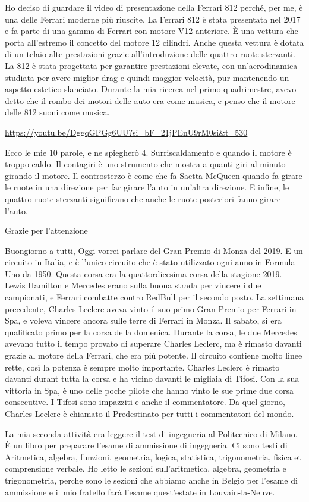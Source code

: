 \documentclass[12pt]{article}
\begin{document}
Ho deciso di guardare il video di presentazione della Ferrari 812 perché, per me, è una delle Ferrari moderne più riuscite. La Ferrari 812 è stata presentata nel 2017 e fa parte di una gamma di Ferrari con motore V12 anteriore. È una vettura che porta all'estremo il concetto del motore 12 cilindri. Anche questa vettura è dotata di un telaio alte prestazioni grazie all'introduzione delle quattro ruote sterzanti. La 812 è stata progettata per garantire prestazioni elevate, con un'aerodinamica studiata per avere miglior drag e quindi maggior velocità, pur mantenendo un aspetto estetico slanciato. Durante la mia ricerca nel primo quadrimestre, avevo detto che il rombo dei motori delle auto era come musica, e penso che il motore delle 812 suoni come musica. %

\url{https://youtu.be/DggqGPGg6UU?si=bF_21jPEnU9rM0si&t=530}

Ecco le mie 10 parole, e ne spiegherò 4. Surriscaldamento e quando il motore è troppo caldo. Il contagiri è uno strumento che mostra a quanti giri al minuto girando il motore. Il controsterzo è come che fa Saetta McQueen quando fa girare le ruote in una direzione per far girare l'auto in un'altra direzione. E infine, le quattro ruote sterzanti significano che anche le ruote posteriori fanno girare l'auto.

Grazie per l'attenzione

\newpage
Buongiorno a tutti, 
Oggi vorrei parlare del Gran Premio di Monza del 2019. E un circuito in Italia, e è l'unico circuito che è stato utilizzato ogni anno in Formula Uno da 1950. 
Questa corsa era la quattordicesima corsa della stagione 2019. Lewis Hamilton e Mercedes erano sulla buona strada per vincere i due campionati, e Ferrari combatte contro RedBull per il secondo posto. La settimana precedente, Charles Leclerc aveva vinto il suo primo Gran Premio per Ferrari in Spa, e voleva vincere ancora sulle terre di Ferrari in Monza. Il sabato, si era qualificato primo per la corsa della domenica. Durante la corsa, le due Mercedes avevano tutto il tempo provato di superare Charles Leclerc, ma è rimasto davanti grazie al motore della Ferrari, che era più potente. Il circuito contiene molto linee rette, così la potenza è sempre molto importante. Charles Leclerc è rimasto davanti durant tutta la corsa e ha vicino davanti le migliaia di Tifosi. Con la sua vittoria in Spa, è uno delle poche pilote che hanno vinto le sue prime due corsa consecutive. I Tifosi sono impazziti e anche il commentatore. Da quel giorno, Charles Leclerc è chiamato il Predestinato per tutti i commentatori del mondo. 

La mia seconda attività era leggere il test di ingegneria al Politecnico di Milano. È un libro per preparare l'esame di ammissione di ingegneria. Ci sono testi di Aritmetica, algebra, funzioni, geometria, logica, statistica, trigonometria, fisica et comprensione verbale. Ho letto le sezioni sull'aritmetica, algebra, geometria e trigonometria, perche sono le sezioni che abbiamo anche in Belgio per l'esame di ammissione e il mio fratello farà l'esame quest'estate in Louvain-la-Neuve.
\end{document}
